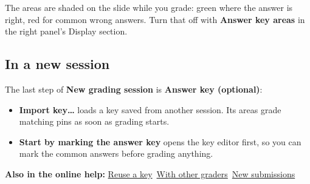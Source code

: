 The areas are shaded on the slide while you grade: green where the answer is right, red for common wrong answers. Turn that off with \textbf{Answer key areas} in the right panel's Display section.

\tocoff
\subsection{In a new session}\label{sec:answer-key:in-a-new-session}
\tocon

The last step of \textbf{New grading session} is \textbf{Answer key (optional)}:

\begin{itemize}[topsep=2pt, itemsep=2pt]
\item \textbf{Import key\ldots{}} loads a key saved from another session. Its areas grade matching pins as soon as grading starts.
\item \textbf{Start by marking the answer key} opens the key editor first, so you can mark the common answers before grading anything.
\end{itemize}

{\small\textbf{Also in the online help:} \href{https://github.com/agadin/micro-speed-grader/blob/main/docs/help/answer-key.md\#reuse-a-key}{Reuse a key}\,\onlinemark{} \textperiodcentered{} \href{https://github.com/agadin/micro-speed-grader/blob/main/docs/help/answer-key.md\#with-other-graders}{With other graders}\,\onlinemark{} \textperiodcentered{} \href{https://github.com/agadin/micro-speed-grader/blob/main/docs/help/answer-key.md\#new-submissions}{New submissions}\,\onlinemark{}}
